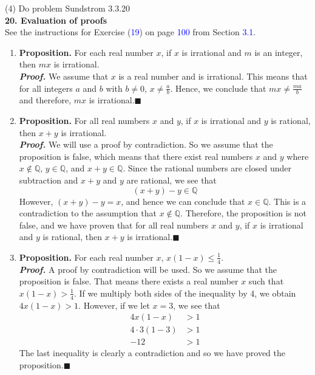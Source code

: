 \documentclass{article}
\begin{document}
(4) Do problem Sundstrom 3.3.20\\
\textbf{20. Evaluation of proofs}\\
See the instructions for Exercise (\textcolor{blue}{19}) on page \textcolor{blue}{100} from Section \textcolor{blue}{3.1}.

\begin{enumerate}[leftmargin=20px,label=(\textbf{\alph*})]
\item \textbf{Proposition.} For each real number $x$, if $x$ is irrational and $m$ is an integer, then $mx$ is irrational.\\

\textit{\textbf{Proof.}} We assume that $x$ is a real number and is irrational. This means that for all integers $a$ and $b$ with $b \neq 0$, $x \neq \frac{a}{b}$. Hence, we conclude that $mx \neq \frac{ma}{b}$ and therefore, $mx$ is irrational.\hfill$\blacksquare$

\item \textbf{Proposition.} For all real numbers $x$ and $y$, if $x$ is irrational and $y$ is rational, then $x + y$ is irrational.\\

\textit{\textbf{Proof.}} We will use a proof by contradiction. So we assume that the proposition is false, which means that there exist real numbers $x$ and $y$ where $x \not \in \mathbb{Q}$, $y \in \mathbb{Q}$, and $x + y \in \mathbb{Q}$. Since the rational numbers are closed under subtraction and $x + y$ and $y$ are rational, we see that 
\begin{equation*}
(x + y) - y \in \mathbb{Q}
\end{equation*}
However, $(x + y) - y = x$, and hence we can conclude that $x \in \mathbb{Q}$. This is a contradiction to the assumption that $x \not \in \mathbb{Q}$. Therefore, the proposition is not false, and we have proven that for all real numbers $x$ and $y$, if $x$ is irrational and $y$ is rational, then $x + y$ is irrational.\hfill$\blacksquare$

\item \textbf{Proposition.} For each real number $x$, $x(1 - x) \leq \frac{1}{4}$.\\
\textit{\textbf{Proof.}} A proof by contradiction will be used. So we assume that the proposition is false. That means there exists a real number $x$ such that $x(1 - x) > \frac{1}{4}$. If we multiply both sides of the inequality by 4, we obtain $4x(1 - x) > 1$. However, if we let $x = 3$, we see that
\begin{align*}
4x(1 - x) &> 1\\
4 \cdot 3(1 - 3) &> 1\\
-12 &> 1
\end{align*} 
The last inequality is clearly a contradiction and so we have proved the proposition.\hfill$\blacksquare$
\end{enumerate}
\end{document}
